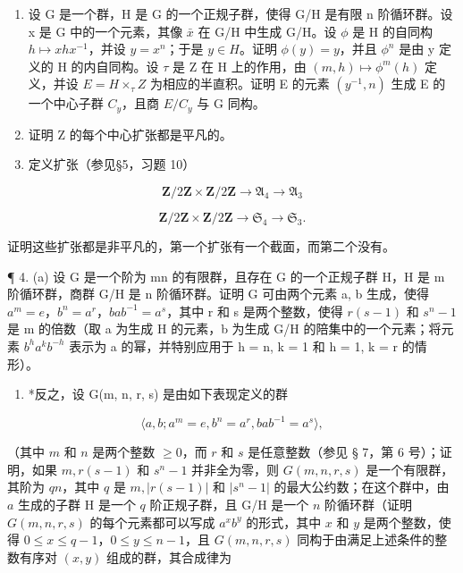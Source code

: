 \BourbakiExercisesSection

\begin{enumerate}
\def\labelenumi{\arabic{enumi}。}
\item
  设 G 是一个群，H 是 G 的一个正规子群，使得 G/H 是有限 n 阶循环群。设 x 是 G 中的一个元素，其像 \(\bar{x}\) 在 G/H 中生成 G/H。设 \(\phi\) 是 H 的自同构 \(h \mapsto xhx^{-1}\)，并设 \(y = x^{n}\)；于是 \(y \in H\)。证明 \(\phi(y) = y\)，并且 \(\phi^{n}\) 是由 y 定义的 H 的内自同构。设 \(\tau\) 是 Z 在 H 上的作用，由 \((m, h) \mapsto \phi^{m}(h)\) 定义，并设 \(E = H \times_{\tau} Z\) 为相应的半直积。证明 E 的元素 \((y^{-1}, n)\) 生成 E 的一个中心子群 \(C_{y}\)，且商 \(E/C_{y}\) 与 G 同构。
\item
  证明 Z 的每个中心扩张都是平凡的。
\item
  定义扩张（参见§5，习题 10）
\end{enumerate}

\[
\mathbf {Z} / 2 \mathbf {Z} \times \mathbf {Z} / 2 \mathbf {Z} \rightarrow \mathfrak {A} _ {4} \rightarrow \mathfrak {A} _ {3}
\]

\[
\mathbf {Z} / 2 \mathbf {Z} \times \mathbf {Z} / 2 \mathbf {Z} \rightarrow \mathfrak {S} _ {4} \rightarrow \mathfrak {S} _ {3}.
\]

证明这些扩张都是非平凡的，第一个扩张有一个截面，而第二个没有。

¶ 4. (a) 设 G 是一个阶为 mn 的有限群，且存在 G 的一个正规子群 H，H 是 m 阶循环群，商群 G/H 是 n 阶循环群。证明 G 可由两个元素 a, b 生成，使得 \(a^{m} = e\)，\(b^{n} = a^{r}\)，\(bab^{-1} = a^{s}\)，其中 r 和 s 是两个整数，使得 \(r(s - 1)\) 和 \(s^{n} - 1\) 是 m 的倍数（取 a 为生成 H 的元素，b 为生成 G/H 的陪集中的一个元素；将元素 \(b^{h}a^{k}b^{-h}\) 表示为 a 的幂，并特别应用于 h = n, k = 1 和 h = 1, k = r 的情形）。

\begin{enumerate}
\def\labelenumi{(\alph{enumi})}
\setcounter{enumi}{1}
\tightlist
\item
  *反之，设 G(m, n, r, s) 是由如下表现定义的群
\end{enumerate}

\[
\langle a, b; a ^ {m} = e, b ^ {n} = a ^ {r}, b a b ^ {- 1} = a ^ {s} \rangle ,
\]

（其中 \(m\) 和 \(n\) 是两个整数 \(\geqslant 0\)，而 \(r\) 和 \(s\) 是任意整数（参见 § 7，第 6 号）；证明，如果 \(m, r(s - 1)\) 和 \(s^n - 1\) 并非全为零，则 \(G(m, n, r, s)\) 是一个有限群，其阶为 \(qn\)，其中 \(q\) 是 \(m, |r(s - 1)|\) 和 \(|s^n - 1|\) 的最大公约数；在这个群中，由 \(a\) 生成的子群 H 是一个 \(q\) 阶正规子群，且 G/H 是一个 \(n\) 阶循环群（证明 \(G(m, n, r, s)\) 的每个元素都可以写成 \(a^x b^y\) 的形式，其中 \(x\) 和 \(y\) 是两个整数，使得 \(0 \leqslant x \leqslant q - 1\)，\(0 \leqslant y \leqslant n - 1\)，且 \(G(m, n, r, s)\) 同构于由满足上述条件的整数有序对 \((x, y)\) 组成的群，其合成律为

